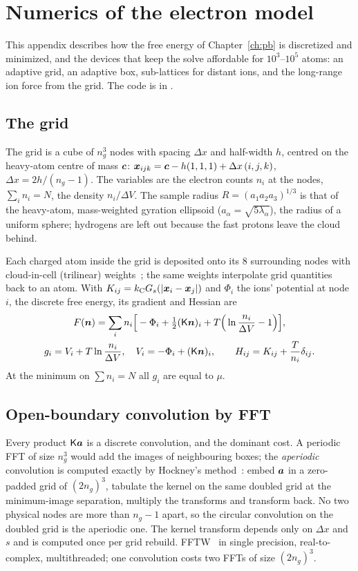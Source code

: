 \chapter{Numerics of the electron model}
\label{app:numerics}

This appendix describes how the free energy of Chapter~\ref{ch:pb} is discretized and minimized, and the devices that
keep the solve affordable for $10^3$--$10^5$ atoms: an adaptive grid, an adaptive box, sub-lattices for distant ions,
and the long-range ion force from the grid.
The code is in .

\section{The grid}

The grid is a cube of $n_g^3$ nodes with spacing $\Delta x$ and half-width $h$, centred on the heavy-atom centre of
mass $\bm{c}$: $\bm{x}_{ijk} = \bm{c} - h(1,1,1) + \Delta x\,(i,j,k)$, $\Delta x = 2h/(n_g-1)$.
The variables are the electron counts $n_i$ at the nodes, $\sum_in_i = N$, the density $n_i/\Delta V$.
The sample radius $R = (a_1a_2a_3)^{1/3}$ is that of the heavy-atom, mass-weighted gyration ellipsoid
($a_\alpha = \sqrt{5\lambda_\alpha}$), the radius of a uniform sphere; hydrogens are left out because the fast protons
leave the cloud behind.

Each charged atom inside the grid is deposited onto its 8 surrounding nodes with cloud-in-cell (trilinear)
weights~\cite{birdsall1991,hockney1988}; the same weights interpolate grid quantities back to an atom.
With $K_{ij} = k_{\mathrm C} G_s(|\bm{x}_i-\bm{x}_j|)$ and $\Phi_i$ the ions' potential at node $i$, the discrete free energy,
its gradient and Hessian are
\begin{gather}
  F(\bm{n}) = \sum_i n_i\Big[-\Phi_i + \tfrac12(\mathsf K\bm{n})_i + T\Big(\ln\frac{n_i}{\Delta V}-1\Big)\Big],\\
  g_i = V_i + T\ln\frac{n_i}{\Delta V},\quad V_i = -\Phi_i + (\mathsf K\bm{n})_i,\qquad H_{ij} = K_{ij} + \frac{T}{n_i}\delta_{ij}.
\end{gather}
At the minimum on $\sum n_i = N$ all $g_i$ are equal to $\mu$.

\section{Open-boundary convolution by FFT}

Every product $\mathsf K\bm{a}$ is a discrete convolution, and the dominant cost.
A periodic FFT of size $n_g^3$ would add the images of neighbouring boxes; the \emph{aperiodic} convolution is computed
exactly by Hockney's method~\cite{hockney1970,eastwood1979}: embed $\bm{a}$ in a zero-padded grid of $(2n_g)^3$,
tabulate the kernel on the same doubled grid at the minimum-image separation, multiply the transforms and transform
back.
No two physical nodes are more than $n_g-1$ apart, so the circular convolution on the doubled grid is the aperiodic one.
The kernel transform depends only on $\Delta x$ and $s$ and is computed once per grid rebuild.
FFTW~\cite{frigo2005} in single precision, real-to-complex, multithreaded; one convolution costs two FFTs of size
$(2n_g)^3$.

